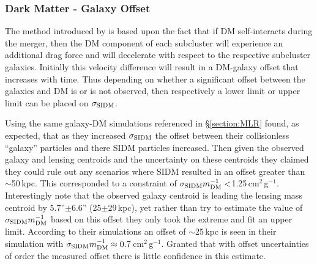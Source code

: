 \subsubsection{Dark Matter - Galaxy Offset}\label{section:DMgalaxyOffsetIntro}

The method introduced by \citet{Randall:2008hs} is based upon the fact that if DM self-interacts during the merger, then the DM component of each subcluster will experience an additional drag force and will decelerate with respect to the respective subcluster galaxies.
Initially this velocity difference will result in a DM-galaxy offset that increases with time.
Thus depending on whether a significant offset between the galaxies and DM is or is not observed, then respectively a lower limit or upper limit can be placed on $\sigma_{\rm SIDM}$.

Using the same galaxy-DM simulations referenced in \S\ref{section:MLR} \citet{Randall:2008hs} found, as expected, that as they increased $\sigma_{\rm SIDM}$ the offset between their collisionless ``galaxy'' particles and there SIDM particles increased.
Then given the observed galaxy and lensing centroids and the uncertainty on these centroids they claimed they could rule out any scenarios where SIDM resulted in an offset greater than $\sim$50\,kpc.
This corresponded to a constraint of $\sigma_{\rm SIDM}m^{-1}_{\rm DM} <$1.25\,cm$^2$\,g$^{-1}$.
Interestingly \citet{Randall:2008hs} note that the observed galaxy centroid is leading the lensing mass centroid by 5.7''$\pm$6.6'' (25$\pm$29\,kpc), yet rather than try to estimate the value of $\sigma_{\rm SIDM}m^{-1}_{\rm DM}$ based on this offset they only took the extreme and fit an upper limit.
According to their simulations an offset of $\sim$25\,kpc is seen in their simulation with $\sigma_{\rm SIDM}m^{-1}_{\rm DM}\approx0.7$\,cm$^2$\,g$^{-1}$.
Granted that with offset uncertainties of order the measured offset there is little confidence in this estimate.

